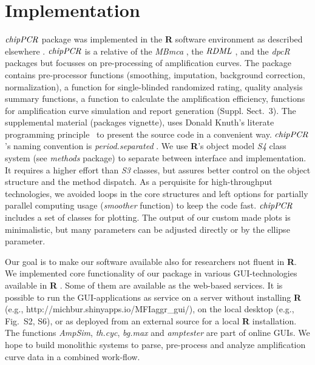 \documentclass{bioinfo}
\begin{document}
\section{Implementation}
\begin{methods}

$\emph{chipPCR}$ package was implemented in the \textbf{R} software environment 
as described elsewhere \citep{RCT_2013,rodiger_rkward_2012}. $\emph{chipPCR}$ is 
a relative of the \emph{MBmca} \citep{roediger_RJ_2013}, the $\emph{RDML}$  
\citep{blagodatskikh_2014}, and the \emph{dpcR} \citep{pabinger_2014} packages 
but focusses on pre-processing of amplification curves. The package contains 
pre-processor functions (smoothing, imputation, background correction, 
normalization), a function for single-blinded randomized rating, quality 
analysis summary functions, a function to calculate the amplification 
efficiency, functions for amplification curve simulation and report 
generation (Suppl. Sect.~3). The supplemental material %
(packages vignette), uses Donald Knuth's literate programming 
principle~\citep{Knuth1984} to present the source code in a convenient way. 
$\emph{chipPCR}$'s naming convention is \textit{period.separated} 
\citep{Baaaath_2012}. We use \textbf{R}'s object model \emph{S4} class system 
(see \emph{methods} package) to separate between interface and implementation. 
It requires a higher effort than \emph{S3} classes, but assures better control 
on the object structure and the method dispatch. As a perquisite for 
high-throughput technologies, we avoided loops in the core structures and left 
options for partially parallel computing usage (\textsl{smoother} function) to 
keep the code fast. $\emph{chipPCR}$ includes a set of classes for plotting. The 
output of our custom made plots is minimalistic, but many parameters can be 
adjusted directly or by the ellipse parameter.

Our goal is to make our software available also for researchers not fluent in 
\textbf{R}. We implemented core functionality of our package in various 
GUI-technologies available in \textbf{R} \citep{rodiger_rkward_2012, 
shiny_2014}. Some of them are available as the web-based services. It is 
possible to run the GUI-applications as service on a server without installing 
\textbf{R} (e.g., http://michbur.shinyapps.io/MFIaggr\_gui/), on the local 
desktop (e.g., Fig.~S2, S6), or as deployed from an external %
source for a local \textbf{R} installation. The functions \textsl{AmpSim}, 
\textsl{th.cyc}, \textsl{bg.max} and \textsl{amptester} are part of online GUIs. 
We hope to build monolithic systems to parse, pre-process and analyze 
amplification curve data in a combined work-flow. 


\end{methods}
\end{document}
